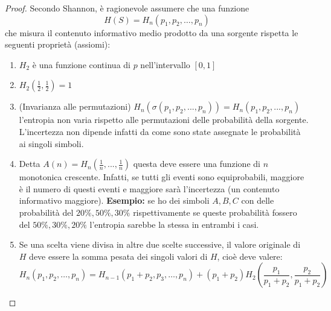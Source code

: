 \documentclass{article}
\theoremstyle{definition}
\numberwithin{equation}{section}
\begin{document}
\begin{proof}
    Secondo Shannon, è ragionevole assumere che una funzione
    \[
        H(S) = H_n(p_1,p_2,\ldots,p_n)
    \]
    che misura il contenuto informativo medio prodotto da una sorgente rispetta le seguenti proprietà (assiomi):
    \begin{enumerate}
        \item $H_2$ è una funzione continua di $p$ nell'intervallo $[0,1]$
        \item $H_2(\frac{1}{2},\frac{1}{2})=1$
        \item (Invarianza alle permutazioni) $H_n(\sigma(p_1,p_2,...,p_n))=H_n(p_1,p_2,...,p_n)$ l'entropia non varia rispetto alle permutazioni delle probabilità della sorgente. L'incertezza non dipende infatti da come sono state assegnate le probabilità ai singoli simboli.
        \item  Detta $A(n)=H_n(\frac{1}{n},...,\frac{1}{n})$ questa deve essere una funzione di $n$ monotonica crescente. Infatti, se tutti gli eventi sono equiprobabili, maggiore è il numero di questi eventi e maggiore sarà l'incertezza (un contenuto informativo maggiore).
              \textbf{Esempio:} se ho dei simboli $A,B,C$ con delle probabilità del $20\%,50\%,30\%$ rispettivamente se queste probabilità fossero del $50\%,30\%,20\%$ l'entropia sarebbe la stessa in entrambi i casi.
        \item Se una scelta viene divisa in altre due scelte successive, il valore originale di $H$ deve essere la somma pesata dei singoli valori di $H$, cioè deve valere:
              \begin{equation}
                  H_n(p_1,p_2,\ldots,p_n)=H_{n-1}(p_1+p_2,p_3,\ldots,p_n)+(p_1+p_2)H_2\left(\frac{p_1}{p_1+p_2},\frac{p_2}{p_1+p_2}\right)
              \end{equation}

\end{enumerate}
\end{proof}
\end{document}
